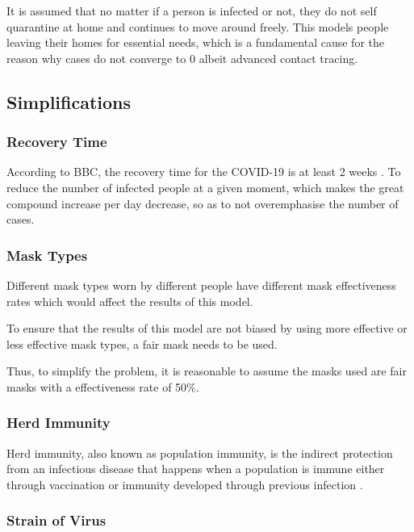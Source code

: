 \documentclass[a4paper,titlepage]{article}
\begin{document}
It is assumed that no matter if a person is infected or not, they do not self quarantine at home and continues to move around freely. This models people leaving their homes for essential needs, which is a fundamental cause for the reason why cases do not converge to 0 albeit advanced contact tracing.

\subsection{Simplifications}

\subsubsection{Recovery Time}

According to BBC, the recovery time for the COVID-19 is at least 2 weeks \cite{recovertime_gallagher_2020}. To reduce the number of infected people at a given moment, which makes the great compound increase per day decrease, so as to not overemphasise the number of cases.

\subsubsection{Mask Types}

Different mask types worn by different people have different mask effectiveness rates which would affect the results of this model.

To ensure that the results of this model are not biased by using more effective or less effective mask types, a fair mask needs to be used.

Thus, to simplify the problem, it is reasonable to assume the masks used are fair masks with a effectiveness rate of 50\%.

\subsubsection{Herd Immunity}

Herd immunity, also known as population immunity, is the indirect protection from an infectious disease that happens when a population is immune either through vaccination or immunity developed through previous infection \cite{herdimmunity_who_2020}.

\subsubsection{Strain of Virus}
\end{document}
